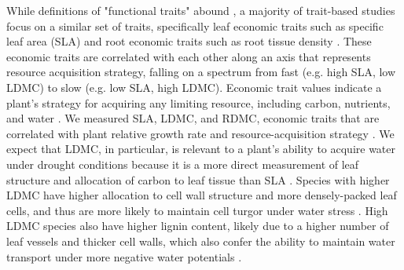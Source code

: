 \documentclass[12pt, letterpaper]{article}
\begin{document}
While definitions of "functional traits" abound , a majority of trait-based studies focus on a similar set of traits, specifically leaf economic traits such as specific leaf area (SLA)  and root economic traits such as root tissue density \cite{Kramer-Walter2016}. These economic traits are correlated with each other along an axis that represents resource acquisition strategy, falling on a spectrum from fast (e.g. high SLA, low LDMC) to slow (e.g. low SLA, high LDMC). Economic trait values indicate a plant’s strategy for acquiring any limiting resource, including carbon, nutrients, and water \cite{Reich2014}. We measured SLA, LDMC, and RDMC, economic traits that are correlated with plant relative growth rate and resource-acquisition strategy \cite{Weiher1999ChallengingEcology}. We expect that LDMC, in particular, is relevant to a plant’s ability to acquire water under drought conditions because it is a more direct measurement of leaf structure and allocation of carbon to leaf tissue than SLA \cite{Niinemets1999ComponentsPlants, Hodgson2011}. Species with higher LDMC have higher allocation to cell wall structure and more densely-packed leaf cells, and thus are more likely to maintain cell turgor under water stress \cite{Niinemets2001Global-scaleShrubs, Poorter2009CausesMeta-analysis, Wilcox2020PlantPrairie}. High LDMC species also have higher lignin content, likely due to a higher number of leaf vessels and thicker cell walls, which also confer the ability to maintain water transport under more negative water potentials \cite{Blumenthal2020}. 
\end{document}
